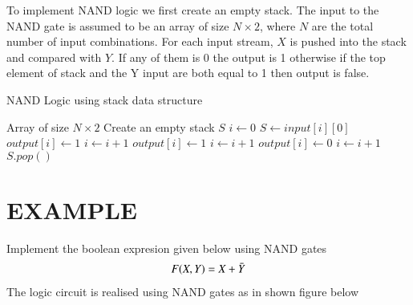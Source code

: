 \documentclass[journal,12pt,twocolumn]{IEEEtran}
\begin{document}
To implement NAND logic we first create an empty stack. The input to the NAND gate is assumed to be an array of size $N \times 2$, where $N$ are the total number of input combinations. For each input stream, $X$ is pushed into the stack and compared with $Y$. If any of them is 0 the output is 1 otherwise if the top element of stack and the Y input are both equal to 1 then output is false. 

\begin{algorithm}
\caption{NAND Logic using stack data structure }\label{alg:cap}
\begin{algorithmic}
\Require Array of size $N \times 2$
\Ensure Create an empty stack $S$
\State $i \gets 0$
\State $S \gets input[i][0]$
    \State $output[i] \gets 1$
    \State $i \gets i+1$
    \State $output[i] \gets 1$
    \State $i \gets i+1$
\Else{}
    \State $output[i] \gets 0$
    \State $i \gets i+1$
\EndIf
\State $S.pop()$

\EndWhile
\end{algorithmic}
\end{algorithm}

\section{EXAMPLE}
Implement the boolean expresion given below using NAND gates
\begin{align}
    F(X,Y) = X + \Bar{Y} 
\end{align}
The logic circuit is realised using NAND gates as in shown figure below \\

 \\ 
\end{document}
